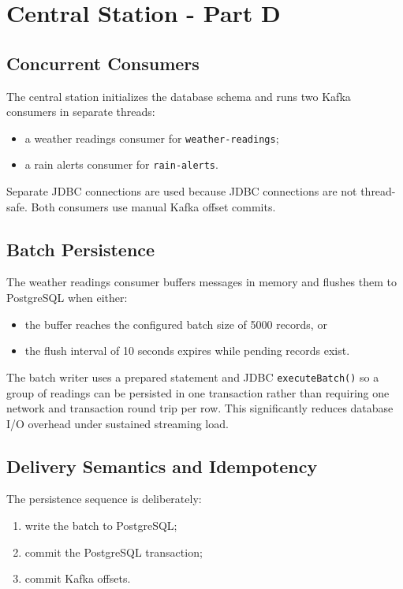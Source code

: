 \documentclass[12pt,a4paper]{article}
\begin{document}
\section{Central Station - Part D}
\subsection{Concurrent Consumers}
The central station initializes the database schema and runs two Kafka consumers in separate threads:
\begin{itemize}
    \item a weather readings consumer for \texttt{weather-readings};
    \item a rain alerts consumer for \texttt{rain-alerts}.
\end{itemize}

Separate JDBC connections are used because JDBC connections are not thread-safe. Both consumers use manual Kafka offset commits.

\subsection{Batch Persistence}
The weather readings consumer buffers messages in memory and flushes them to PostgreSQL when either:
\begin{itemize}
    \item the buffer reaches the configured batch size of 5000 records, or
    \item the flush interval of 10 seconds expires while pending records exist.
\end{itemize}

The batch writer uses a prepared statement and JDBC \texttt{executeBatch()} so a group of readings can be persisted in one transaction rather than requiring one network and transaction round trip per row. This significantly reduces database I/O overhead under sustained streaming load.

\subsection{Delivery Semantics and Idempotency}
The persistence sequence is deliberately:
\begin{enumerate}[label=\arabic*.]
    \item write the batch to PostgreSQL;
    \item commit the PostgreSQL transaction;
    \item commit Kafka offsets.
\end{enumerate}
\end{document}
